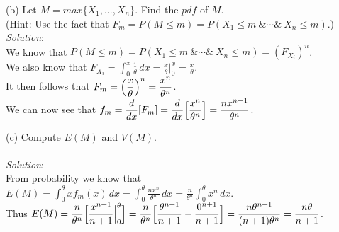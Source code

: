 \documentclass[12pt]{article}
\begin{document}

(b) Let $ M = max\{X_{1},...,X_{n}\} $. Find the $ pdf $ of $ M $. \\
(Hint: Use the fact that $ F_{m} = P(M \leq m) = P(X_{1} \leq m \ \& \cdots \& \ X_{n} \leq m) $.) 
\vspace{2.5mm} \\
\textit{Solution}:
\vspace{2.5mm} \\

\noindent 
We know that $ P(M \leq m) = P(X_{1} \leq m \ \& \cdots \& \ X_{n} \leq m) = (F_{X_{i}})^{n} $. \\

\noindent 
We also know that $ \displaystyle F_{X_{i}} = \int_{0}^{x} \frac{1}{\theta} \,dx = \frac{x}{\theta} \Big|_{0}^{x} = \frac{x}{\theta} $. \\

\noindent 
It then follows that $ \displaystyle F_{m} = \Bigl( \frac{x}{\theta} \Bigr)^{n} = \frac{x^{n}}{\theta^{n}} $. \\

\noindent 
We can now see that $ \displaystyle f_{m} = \frac{d}{dx}[F_{m}] = \frac{d}{dx} \Bigl[ \frac{x^{n}}{\theta^{n}} \Bigr] = \frac{nx^{n-1}}{\theta^{n}} $. \\
\newpage


(c) Compute $ E(M) $ and $ V(M) $. \\
\vspace{2.5mm} \\
\textit{Solution}:
\vspace{2.5mm} \\

\noindent 
From probability we know that $ \displaystyle E(M) = \int_{0}^{\theta} xf_{m}(x) \, dx = \int_{0}^{\theta} \frac{nx^{n}}{\theta^{n}} \, dx = \frac{n}{\theta^{n}} \int_{0}^{\theta} x^{n} \, dx $. \\

\noindent 
Thus $ \displaystyle E(M) = \frac{n}{\theta^{n}} \Bigl[ \frac{x^{n + 1}}{n + 1} \Big|_{0}^{\theta} \Bigr] = \frac{n}{\theta^{n}} \Bigl[ \frac{\theta^{n + 1}}{n + 1} - \frac{0^{n + 1}}{n + 1} \Bigr] = \frac{n\theta^{n + 1}}{(n + 1)\theta^{n}} = \frac{n\theta}{n + 1} $. \\
\end{document}

